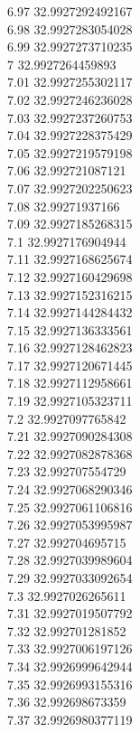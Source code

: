 {6.97	32.9927292492167\\
6.98	32.9927283054028\\
6.99	32.9927273710235\\
7	32.9927264459893\\
7.01	32.9927255302117\\
7.02	32.9927246236028\\
7.03	32.9927237260753\\
7.04	32.9927228375429\\
7.05	32.9927219579198\\
7.06	32.992721087121\\
7.07	32.9927202250623\\
7.08	32.99271937166\\
7.09	32.9927185268315\\
7.1	32.9927176904944\\
7.11	32.9927168625674\\
7.12	32.9927160429698\\
7.13	32.9927152316215\\
7.14	32.9927144284432\\
7.15	32.9927136333561\\
7.16	32.9927128462823\\
7.17	32.9927120671445\\
7.18	32.9927112958661\\
7.19	32.9927105323711\\
7.2	32.9927097765842\\
7.21	32.9927090284308\\
7.22	32.9927082878368\\
7.23	32.992707554729\\
7.24	32.9927068290346\\
7.25	32.9927061106816\\
7.26	32.9927053995987\\
7.27	32.992704695715\\
7.28	32.9927039989604\\
7.29	32.9927033092654\\
7.3	32.9927026265611\\
7.31	32.9927019507792\\
7.32	32.992701281852\\
7.33	32.9927006197126\\
7.34	32.9926999642944\\
7.35	32.9926993155316\\
7.36	32.992698673359\\
7.37	32.9926980377119\\
}
